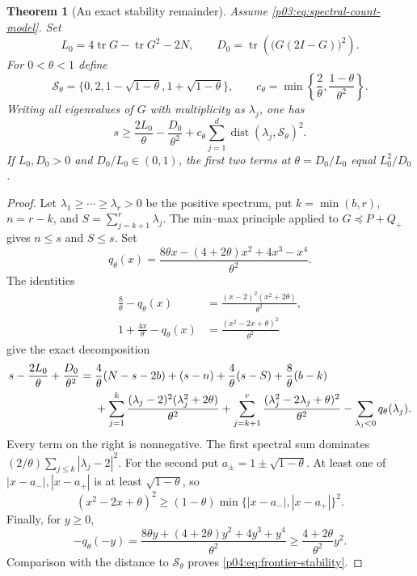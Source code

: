 \documentclass[11pt,letterpaper]{article}
\newtheorem{theorem}{Theorem}[section]
\theoremstyle{definition}
\theoremstyle{remark}
\newcommand{\1}{\mathbf 1}
\begin{document}
\begin{theorem}[An exact stability remainder]\label{p04:thm:frontier-stability}
Assume \eqref{p03:eq:spectral-count-model}. Set
\[
 L_0=4\operatorname{tr}G-\operatorname{tr}G^2-2N,
 \qquad D_0=\operatorname{tr}\!\left(\bigl(G(2I-G)\bigr)^2\right).
\]
For $0<\theta<1$ define
\[
 \mathcal S_\theta=\{0,2,1-\sqrt{1-\theta},1+\sqrt{1-\theta}\},
 \qquad
 c_\theta=\min\left\{\frac2\theta,
                   \frac{1-\theta}{\theta^2}\right\}.
\]
Writing all eigenvalues of $G$ with multiplicity as $\lambda_j$, one has
\begin{equation}\label{p04:eq:frontier-stability}
 s\ge \frac{2L_0}{\theta}-\frac{D_0}{\theta^2}
       +c_\theta\sum_{j=1}^d
            \operatorname{dist}(\lambda_j,\mathcal S_\theta)^2.
\end{equation}
If $L_0,D_0>0$ and $D_0/L_0\in(0,1)$, the first two terms at
$\theta=D_0/L_0$ equal $L_0^2/D_0$.
\end{theorem}
\begin{proof}
Let $\lambda_1\ge\cdots\ge\lambda_r>0$ be the positive spectrum,
put $k=\min(b,r)$, $n=r-k$, and
$S=\sum_{j=k+1}^r\lambda_j$. The min--max principle applied to
$G\preceq P+Q_+$ gives $n\le s$ and $S\le s$.
Set
\[
 q_\theta(x)=
 \frac{8\theta x-(4+2\theta)x^2+4x^3-x^4}{\theta^2}.
\]
The identities
\begin{align*}
 \frac8\theta-q_\theta(x)
 &=\frac{(x-2)^2(x^2+2\theta)}{\theta^2},\\
 1+\frac{4x}\theta-q_\theta(x)
 &=\frac{(x^2-2x+\theta)^2}{\theta^2}
\end{align*}
give the exact decomposition
\begin{align}\label{p04:eq:frontier-defect-identity}
 s-\frac{2L_0}\theta+\frac{D_0}{\theta^2}
 ={}&\frac4\theta(N-s-2b)+(s-n)+\frac4\theta(s-S)
                +\frac8\theta(b-k)\notag\\
 &+\sum_{j=1}^k
       \frac{(\lambda_j-2)^2(\lambda_j^2+2\theta)}{\theta^2}
   +\sum_{j=k+1}^r
       \frac{(\lambda_j^2-2\lambda_j+\theta)^2}{\theta^2}
   -\sum_{\lambda_j<0}q_\theta(\lambda_j).
\end{align}
Every term on the right is nonnegative. The first spectral sum
dominates $(2/\theta)\sum_{j\le k}|\lambda_j-2|^2$.
For the second put $a_\pm=1\pm\sqrt{1-\theta}$. At least one of
$|x-a_-|,|x-a_+|$ is at least $\sqrt{1-\theta}$, so
\[
 (x^2-2x+\theta)^2
 \ge(1-\theta)\min\{|x-a_-|,|x-a_+|\}^2.
\]
Finally, for $y\ge0$,
\[
 -q_\theta(-y)=
 \frac{8\theta y+(4+2\theta)y^2+4y^3+y^4}{\theta^2}
 \ge\frac{4+2\theta}{\theta^2}y^2.
\]
Comparison with the distance to $\mathcal S_\theta$ proves
\eqref{p04:eq:frontier-stability}.
\end{proof}
\end{document}
